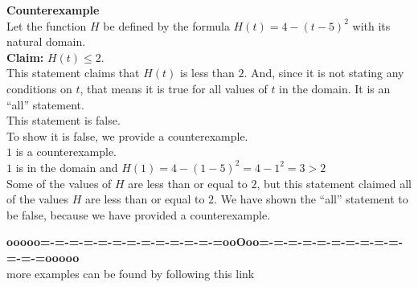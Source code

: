 \documentclass{ximera}
\begin{document}
\begin{example}    \textbf{\textcolor{blue!55!black}{Counterexample}} \\



Let the function $H$ be defined by the formula $H(t) = 4 - (t-5)^2$ with its natural domain. \\

\textbf{\textcolor{blue!55!black}{Claim:}} $H(t) \leq 2$.  \\



This statement claims that $H(t)$ is less than $2$.  And, since it is not stating any conditions on $t$, that means it is true for all values of $t$ in the domain.  It is an ``all'' statement. \\

This statement is false. \\

To show it is false, we provide a counterexample. \\ 


$1$ is a counterexample. \\


$1$ is in the domain and  $H(1) = 4 - (1-5)^2 = 4 - 1^2 = 3 > 2$ \\



Some of the values of $H$ are less than or equal to $2$, but this statement claimed all of the values $H$ are less than or equal to $2$.  We have shown the ``all'' statement to be false, because we have provided a counterexample.



\end{example}










\begin{center}
\textbf{\textcolor{green!50!black}{ooooo=-=-=-=-=-=-=-=-=-=-=-=-=ooOoo=-=-=-=-=-=-=-=-=-=-=-=-=ooooo}} \\

more examples can be found by following this link\\ 

\end{center}
\end{document}
